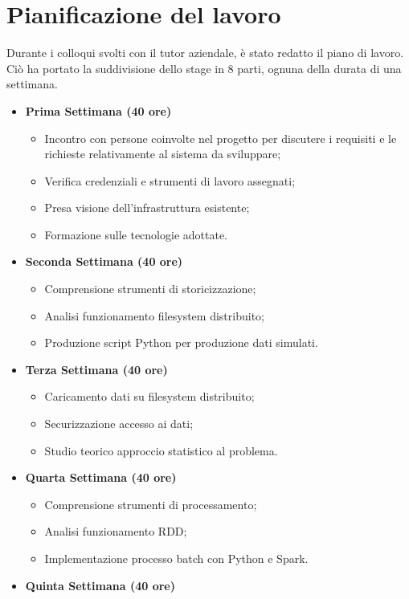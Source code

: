 \section{Pianificazione del lavoro}
Durante i colloqui svolti con il tutor aziendale, è stato redatto il piano di lavoro. Ciò ha portato la suddivisione dello stage in 8 parti, ognuna della durata di una settimana.
\begin{itemize}
	\item[] \textbf{Prima Settimana (40 ore)}
	\begin{itemize}
		\item Incontro con persone coinvolte nel progetto per discutere i requisiti e le richieste
		relativamente al sistema da sviluppare;
		\item Verifica credenziali e strumenti di lavoro assegnati;
		\item Presa visione dell’infrastruttura esistente;
		\item Formazione sulle tecnologie adottate.
	\end{itemize}
	\item[] \textbf{Seconda Settimana (40 ore)} 
	\begin{itemize}
		\item Comprensione strumenti di storicizzazione;
		\item Analisi funzionamento filesystem distribuito;
		\item Produzione script Python per produzione dati simulati.
	\end{itemize}
	\item[] \textbf{Terza Settimana (40 ore)} 
	\begin{itemize}
		\item Caricamento dati su filesystem distribuito;
		\item Securizzazione accesso ai dati;
		\item Studio teorico approccio statistico al problema.
	\end{itemize}
	\item[] \textbf{Quarta Settimana (40 ore)} 
	\begin{itemize}
		\item Comprensione strumenti di processamento;
		\item Analisi funzionamento RDD;
		\item Implementazione processo batch con Python e Spark.        
	\end{itemize}
	\item[] \textbf{Quinta Settimana (40 ore)} 
	\begin{itemize}

\end{itemize}
\end{itemize}
